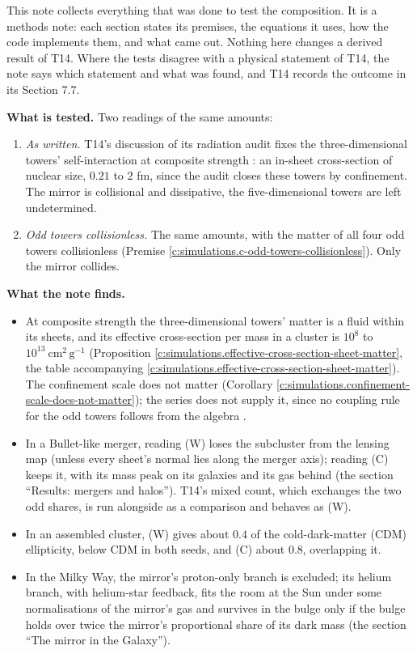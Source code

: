 \documentclass[11pt]{article}
\theoremstyle{definition}
\theoremstyle{plain}
\providecommand{\cmg}{}\renewcommand{\cmg}{\mathrm{cm^{2}\,g^{-1}}}
\begin{document}
This note collects everything that was done to test the composition. It is a methods note: each section states its premises, the equations it uses, how the code implements them, and what came out. Nothing here changes a derived result of T14. Where the tests disagree with a physical statement of T14, the note says which statement and what was found, and T14 records the outcome in its Section 7.7.

\label{c:note.simulations.setting-introduction-2}
\textbf{What is tested.} Two readings of the same amounts:
\begin{enumerate}
\item[(W)] \emph{As written.} T14's discussion of its radiation audit fixes the three-dimensional towers' self-interaction at composite strength \cite[Prop.~6.2]{ButlerT14}: an in-sheet cross-section of nuclear size, $0.21$ to $2$ fm, since the audit closes these towers by confinement. The mirror is collisional and dissipative, the five-dimensional towers are left undetermined.
\item[(C)] \emph{Odd towers collisionless.} The same amounts, with the matter of all four odd towers collisionless (Premise \ref{c:simulations.c-odd-towers-collisionless}). Only the mirror collides.
\end{enumerate}

\label{c:note.simulations.setting-introduction-3}
\textbf{What the note finds.}
\begin{itemize}
\item At composite strength the three-dimensional towers' matter is a fluid within its sheets, and its effective cross-section per mass in a cluster is $10^{8}$ to $10^{13}\ \cmg$ (Proposition \ref{c:simulations.effective-cross-section-sheet-matter}, the table accompanying \ref{c:simulations.effective-cross-section-sheet-matter}). The confinement scale does not matter (Corollary \ref{c:simulations.confinement-scale-does-not-matter}); the series does not supply it, since no coupling rule for the odd towers follows from the algebra \cite[Prop.~A.4]{ButlerT14}.
\item In a Bullet-like merger, reading (W) loses the subcluster from the lensing map (unless every sheet's normal lies along the merger axis); reading (C) keeps it, with its mass peak on its galaxies and its gas behind (the section ``Results: mergers and halos''). T14's mixed count, which exchanges the two odd shares, is run alongside as a comparison and behaves as (W).
\item In an assembled cluster, (W) gives about $0.4$ of the cold-dark-matter (CDM) ellipticity, below CDM in both seeds, and (C) about $0.8$, overlapping it.
\item In the Milky Way, the mirror's proton-only branch is excluded; its helium branch, with helium-star feedback, fits the room at the Sun under some normalisations of the mirror's gas and survives in the bulge only if the bulge holds over twice the mirror's proportional share of its dark mass (the section ``The mirror in the Galaxy'').
\end{itemize}
\end{document}
